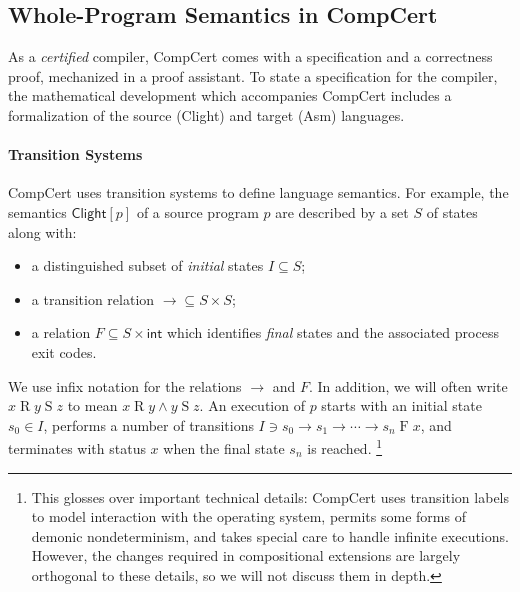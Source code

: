 \documentclass[acmsmall,screen,review,anonymous,nonacm]{acmart}
\newcommand{\kw}[1]{\ensuremath{ \mathsf{#1} }}
\begin{document}
\subsection{Whole-Program Semantics in CompCert} \label{sec:compcert} %

As a \emph{certified} compiler,
CompCert comes with a specification
and a correctness proof,
mechanized in a proof assistant.
To state a specification for the compiler,
the mathematical development which accompanies
CompCert
includes a formalization of the source (Clight) and target (Asm) languages.

\paragraph{Transition Systems} %

CompCert uses transition systems
to define language semantics.
For example,
the semantics $\kw{Clight}[p]$
of a source program $p$
are described by a set $S$ of states along with:%
\begin{itemize}
  \item a distinguished subset of \emph{initial} states $I \subseteq S$;
  \item a transition relation ${\rightarrow} \subseteq S \times S$;
  \item a relation $F \subseteq S \times \kw{int}$ which identifies
    \emph{final} states and the associated process exit codes.
\end{itemize}
We use infix notation for the relations $\rightarrow$ and $F$.
In addition, we will often write $x \mathrel{R} y \mathrel{S} z$
to mean $x \mathrel{R} y \mathrel\wedge y \mathrel{S} z$.
An execution of $p$ starts with an initial state $s_0 \in I$,
performs a number of transitions
$
  I \ni s_0 \rightarrow s_1 \rightarrow \cdots \rightarrow s_n \mathrel{F} x
$,
and terminates with status $x$ when the final state $s_n$ is reached.%
\footnote{%
  This glosses over important technical details:
  CompCert uses transition labels to model interaction with the operating system,
  permits some forms of demonic nondeterminism,
  and takes special care to handle infinite executions.
  However, the changes required in compositional extensions
  are largely orthogonal to these details,
  so we will not discuss them in depth.}

\end{document}
